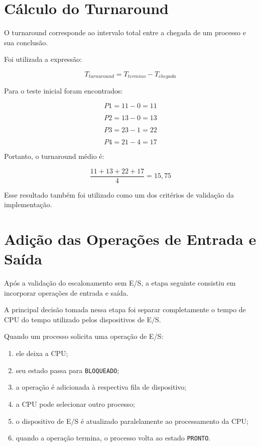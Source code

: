 \documentclass[12pt,a4paper]{article}
\begin{document}

\section{Cálculo do Turnaround}

O turnaround corresponde ao intervalo total entre a chegada de um
processo e sua conclusão.

Foi utilizada a expressão:

\[
T_{turnaround} =
T_{termino} -
T_{chegada}
\]

Para o teste inicial foram encontrados:

\[
P1 = 11 - 0 = 11
\]

\[
P2 = 13 - 0 = 13
\]

\[
P3 = 23 - 1 = 22
\]

\[
P4 = 21 - 4 = 17
\]

Portanto, o turnaround médio é:

\[
\frac{11+13+22+17}{4}
=
15,75
\]

Esse resultado também foi utilizado como um dos critérios de
validação da implementação.



\section{Adição das Operações de Entrada e Saída}

Após a validação do escalonamento sem E/S, a etapa seguinte consistiu
em incorporar operações de entrada e saída.

A principal decisão tomada nessa etapa foi separar completamente o
tempo de CPU do tempo utilizado pelos dispositivos de E/S.

Quando um processo solicita uma operação de E/S:

\begin{enumerate}

    \item ele deixa a CPU;

    \item seu estado passa para \texttt{BLOQUEADO};

    \item a operação é adicionada à respectiva fila de dispositivo;

    \item a CPU pode selecionar outro processo;

    \item o dispositivo de E/S é atualizado paralelamente ao
    processamento da CPU;

    \item quando a operação termina, o processo volta ao estado
    \texttt{PRONTO}.

\end{enumerate}
\end{document}
